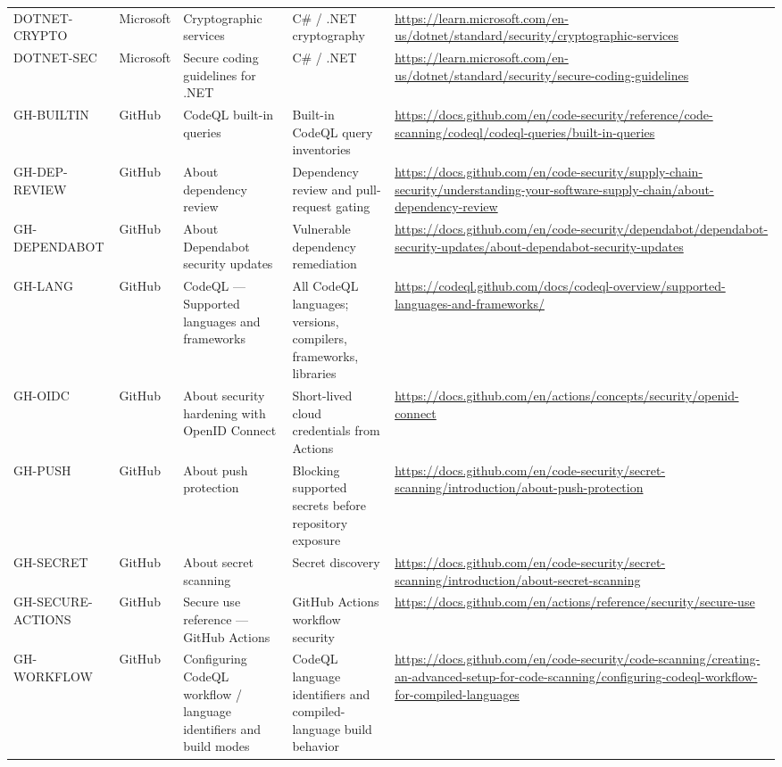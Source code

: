 \documentclass[10pt,letterpaper]{article}
\begin{document}
\begin{landscape}
\begin{longtable}{@{}P{0.82in}P{1.23in}P{2.25in}P{1.7in}P{3.0in}@{}}
DOTNET-CRYPTO & Microsoft & Cryptographic services & C\# / .NET cryptography & \url{https://learn.microsoft.com/en-us/dotnet/standard/security/cryptographic-services}\\
DOTNET-SEC & Microsoft & Secure coding guidelines for .NET & C\# / .NET & \url{https://learn.microsoft.com/en-us/dotnet/standard/security/secure-coding-guidelines}\\
GH-BUILTIN & GitHub & CodeQL built-in queries & Built-in CodeQL query inventories & \url{https://docs.github.com/en/code-security/reference/code-scanning/codeql/codeql-queries/built-in-queries}\\
GH-DEP-REVIEW & GitHub & About dependency review & Dependency review and pull-request gating & \url{https://docs.github.com/en/code-security/supply-chain-security/understanding-your-software-supply-chain/about-dependency-review}\\
GH-DEPENDABOT & GitHub & About Dependabot security updates & Vulnerable dependency remediation & \url{https://docs.github.com/en/code-security/dependabot/dependabot-security-updates/about-dependabot-security-updates}\\
GH-LANG & GitHub & CodeQL --- Supported languages and frameworks & All CodeQL languages; versions, compilers, frameworks, libraries & \url{https://codeql.github.com/docs/codeql-overview/supported-languages-and-frameworks/}\\
GH-OIDC & GitHub & About security hardening with OpenID Connect & Short-lived cloud credentials from Actions & \url{https://docs.github.com/en/actions/concepts/security/openid-connect}\\
GH-PUSH & GitHub & About push protection & Blocking supported secrets before repository exposure & \url{https://docs.github.com/en/code-security/secret-scanning/introduction/about-push-protection}\\
GH-SECRET & GitHub & About secret scanning & Secret discovery & \url{https://docs.github.com/en/code-security/secret-scanning/introduction/about-secret-scanning}\\
GH-SECURE-ACTIONS & GitHub & Secure use reference --- GitHub Actions & GitHub Actions workflow security & \url{https://docs.github.com/en/actions/reference/security/secure-use}\\
GH-WORKFLOW & GitHub & Configuring CodeQL workflow / language identifiers and build modes & CodeQL language identifiers and compiled-language build behavior & \url{https://docs.github.com/en/code-security/code-scanning/creating-an-advanced-setup-for-code-scanning/configuring-codeql-workflow-for-compiled-languages}\\

\end{longtable}
\end{landscape}
\end{document}
